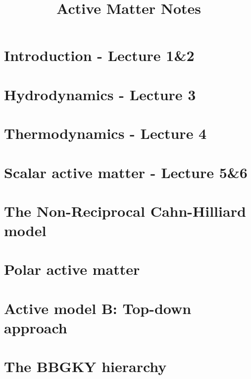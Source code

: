 \documentclass[10pt, a4paper, oneside]{book}
\title{Active Matter Notes}
\begin{document}
    \maketitle
    \clearpage


    \tableofcontents
    \clearpage

    \setlength{\parindent}{0em}
    \setlength{\parskip}{0.8em}


    \chapter{Introduction - Lecture 1\&2}
    

    \chapter{Hydrodynamics - Lecture 3}
    

    \chapter{Thermodynamics - Lecture 4}
     

    \chapter{Scalar active matter - Lecture 5\&6}
    

    \chapter{The Non-Reciprocal Cahn-Hilliard model}
    

    \chapter{Polar active matter}
    

    \appendix

    \chapter{Active model B: Top-down approach}
    

    \chapter{The BBGKY hierarchy}
    
\end{document}
